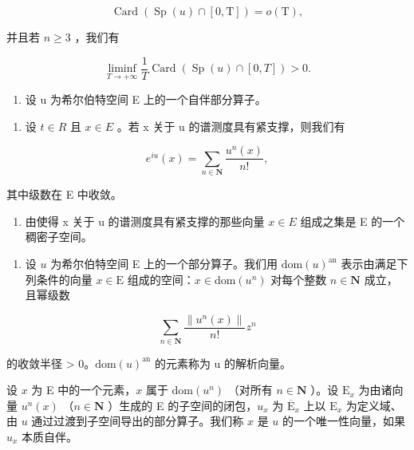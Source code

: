 \[
\operatorname{Card} (\operatorname{Sp} (u) \cap [ 0, \mathrm{T} ]) = o (\mathrm{T}),
\]

并且若 \(n\geqslant 3\) ，我们有

\[
\liminf _ {T \to + \infty} \frac {1}{T} \operatorname{Card} (\operatorname{Sp} (u) \cap [ 0, T ]) > 0.
\]

\begin{enumerate}
\def\labelenumi{\arabic{enumi})}
\setcounter{enumi}{18}
\tightlist
\item
  设 u 为希尔伯特空间 E 上的一个自伴部分算子。
\end{enumerate}

\begin{enumerate}
\def\labelenumi{\alph{enumi})}
\tightlist
\item
  设 \(t \in R\) 且 \(x \in E\) 。若 x 关于 u 的谱测度具有紧支撑，则我们有
\end{enumerate}

\[
e ^ {i u} (x) = \sum_ {n \in \mathbf {N}} \frac {u ^ {n} (x)}{n !},
\]

其中级数在 E 中收敛。

\begin{enumerate}
\def\labelenumi{\alph{enumi})}
\setcounter{enumi}{1}
\tightlist
\item
  由使得 x 关于 u 的谱测度具有紧支撑的那些向量 \(x \in E\) 组成之集是 E 的一个稠密子空间。
\end{enumerate}

\begin{enumerate}
\def\labelenumi{\arabic{enumi})}
\setcounter{enumi}{19}
\tightlist
\item
  设 \(u\) 为希尔伯特空间 E 上的一个部分算子。我们用 \(\mathrm{dom}(u)^{\mathrm{an}}\) 表示由满足下列条件的向量 \(x \in \mathrm{E}\) 组成的空间：\(x \in \mathrm{dom}(u^n)\) 对每个整数 \(n \in \mathbf{N}\) 成立，且幂级数
\end{enumerate}

\[
\sum_ {n \in \mathbf {N}} \frac {\| u ^ {n} (x) \|}{n !} z ^ {n}\tag{23}
\]

的收敛半径 \textgreater{} 0。\(\text{dom}(u)^{\text{an}}\) 的元素称为 u 的解析向量。

设 \(x\) 为 E 中的一个元素，\(x\) 属于 \(\mathrm{dom}(u^n)\) （对所有 \(n \in \mathbf{N}\) ）。设 \(\mathrm{E}_x\) 为由诸向量 \(u^n(x)\) （\(n \in \mathbf{N}\) ）生成的 E 的子空间的闭包，\(u_x\) 为 \(\overline{\mathrm{E}}_x\) 上以 \(\mathrm{E}_x\) 为定义域、由 \(u\) 通过过渡到子空间导出的部分算子。我们称 \(x\) 是 \(u\) 的一个唯一性向量，如果 \(u_x\) 本质自伴。


